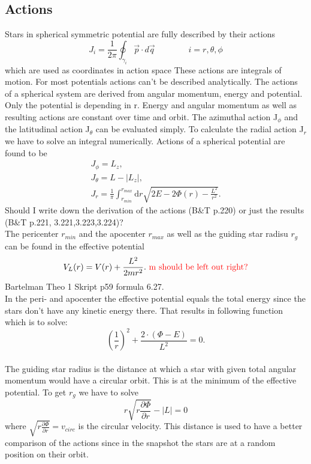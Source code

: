 \documentclass[a4paper,12pt,abstracton]{scrartcl}
\begin{document}
\subsection{Actions}
Stars in spherical symmetric potential are fully described by their actions \begin{equation}
J_i=\frac{1}{2\pi}\oint_{\gamma_i}\vec{p}\cdot d\vec{q} \qquad\qquad i=r,\theta,\phi
\end{equation} which are used as coordinates in action space
These actions are integrals of motion. For most potentials actions can't be described analytically. The actions of a spherical system are derived from angular momentum, energy and potential. Only the potential is depending in r. Energy and angular momentum as well as resulting actions are constant over time and orbit. The azimuthal action J\(_\phi\) and the latitudinal action J\(_\theta\) can be evaluated simply. To calculate the radial action J\(_r\) we have to solve an integral numerically. Actions of a spherical potential are found to be \begin{align}
J_\phi=L_z, \\ J_\theta=L-|L_z|, \\ J_r=\frac{1}{\pi} \int_{r_{min}}^{r_{max}} \mathrm{d}r \sqrt{2E-2\Phi(r)-\frac{L^2}{r^2}}.
\end{align}\color{red} Should I write down the derivation of the actions (B\&T p.220) or just the results (B\&T p.221, 3.221,3.223,3.224)?\color{black} \\ The pericenter \(r_{min}\) and the apocenter \(r_{max}\) as well as the guiding star radisu \(r_g\) can be found in the effective potential \begin{equation}
V_L(r)=V(r)+\frac{L^2}{2mr^2}.\  \color{red} \mathrm{m\ should\ be\ left\ out\ right?} \color{black}
\end{equation} \color{red} Bartelman Theo 1 Skript p59 formula 6.27. \\ \color{black} In the peri- and apocenter the effective potential equals the total energy since the stars don't have any kinetic energy there. That results in following function which is to solve: \[\left(\frac{1}{r}\right)^2+\frac{2\cdot (\Phi-E)}{L^2}=0.\] \\ The guiding star radius is the distance at which a star with given total angular momentum would have a circular orbit. This is at the minimum of the effective potential. To get \(r_g\) we have to solve \[r\sqrt{r\frac{\partial\Phi}{\partial r}}-|L|=0\] where \(\sqrt{r\frac{\partial\Phi}{\partial r}}=v_{circ}\) is the circular velocity. This distance is used to have a better comparison of the actions since in the snapshot the stars are at a random position on their orbit.
\end{document}
